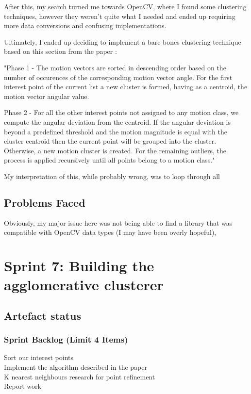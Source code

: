 After this, my search turned me towards OpenCV, where I found some clustering techniques, however they weren't quite what I needed and ended up requiring more data conversions and confusing implementations.

Ultimately, I ended up deciding to implement a bare bones clustering technique based on this section from the paper \cite{PhoneObstacleAvoidance}:

 "Phase 1 - The motion vectors are sorted in descending order based on the number of occurences of the corresponding motion vector angle. For the first interest point of the current list a new cluster is formed, having as a centroid, the motion vector angular value.
 
 Phase 2 - For all the other interest points not assigned to any motion class, we compute the angular deviation from the centroid. If the angular deviation is beyond a predefined threshold and the motion magnitude is equal with the cluster centroid then the current point will be grouped into the cluster. Otherwise, a new motion cluster is created. For the remaining outliers, the process is applied recursively until all points belong to a motion class."
 
 My interpretation of this, while probably wrong, was to loop through all 


\subsection{Problems Faced}
Obviously, my major issue here was not being able to find a library that was compatible with OpenCV data types (I may have been overly hopeful), 
\section{Sprint 7: Building the agglomerative clusterer}
\subsection{Artefact status}
\subsubsection{Sprint Backlog (Limit 4 Items)}
\begin{description}
  \item[Sort our interest points]
  \item[Implement the algorithm described in the paper]
  \item[K nearest neighbours research for point refinement]
  \item[Report work]
\end{description}
